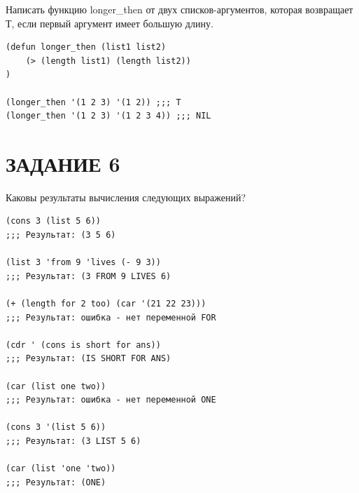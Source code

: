 Написать функцию longer\_then от двух списков-аргументов,
которая возвращает Т, если первый аргумент имеет большую длину.

\begin{lstlisting}
(defun longer_then (list1 list2)
    (> (length list1) (length list2))
)

(longer_then '(1 2 3) '(1 2)) ;;; T
(longer_then '(1 2 3) '(1 2 3 4)) ;;; NIL
\end{lstlisting}

\chapter{ЗАДАНИЕ 6}

Каковы результаты вычисления следующих выражений?

\begin{lstlisting}
(cons 3 (list 5 6))
;;; Результат: (3 5 6)

(list 3 'from 9 'lives (- 9 3))
;;; Результат: (3 FROM 9 LIVES 6)

(+ (length for 2 too) (car '(21 22 23)))
;;; Результат: ошибка - нет переменной FOR

(cdr ' (cons is short for ans))
;;; Результат: (IS SHORT FOR ANS)

(car (list one two))
;;; Результат: ошибка - нет переменной ONE

(cons 3 '(list 5 6))
;;; Результат: (3 LIST 5 6)

(car (list 'one 'two))
;;; Результат: (ONE)
\end{lstlisting}
